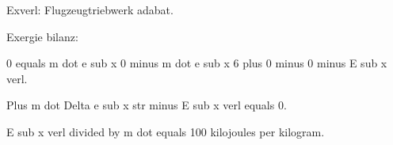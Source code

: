 Exverl: Flugzeugtriebwerk adabat.

Exergie bilanz:

0 equals m dot e sub x 0 minus m dot e sub x 6 plus 0 minus 0 minus E sub x verl.

Plus m dot Delta e sub x str minus E sub x verl equals 0.

E sub x verl divided by m dot equals 100 kilojoules per kilogram.